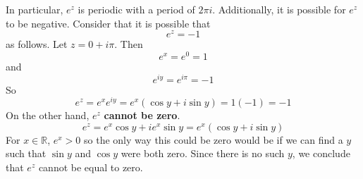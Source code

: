 \documentclass[11pt, oneside]{article}   	%
\begin{document}
In particular, $e^z$ is periodic with a period of $2 \pi i$.  Additionally, it is possible for $e^z$ to be negative.  Consider that it is possible that
\[ e^z = -1 \]
as follows.  Let $z = 0 + i\pi$.  Then 
\[ e^x = e^0 = 1 \]
and
\[ e^{iy} = e^{i\pi} = -1 \]
So
\[ e^z = e^x e^{iy} = e^x(\cos y + i \sin y) = 1 (-1) = -1 \]
On the other hand, $e^z$ \textbf{cannot be zero}.
\[ e^z = e^x \cos y + i e^x \sin y = e^x(\cos y + i \sin y) \]
For $x \in \mathbb{R}$, $e^x > 0$ so the only way this could be zero would be if we can find a $y$ such that $\sin y$ and $\cos y$ were both zero.  Since there is no such $y$, we conclude that $e^z$ cannot be equal to zero.
\end{document}
